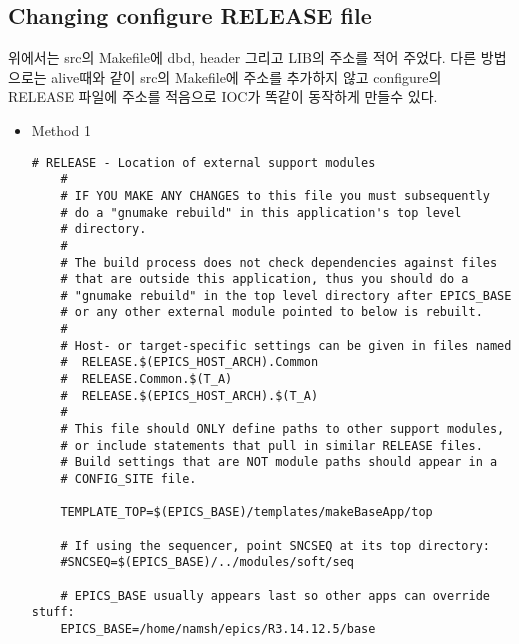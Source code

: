 \documentclass[11pt
  , a4paper
  , article
  , oneside
]{memoir}
\begin{document}
\subsection{Changing configure RELEASE file}
위에서는 src의 Makefile에 dbd, header 그리고 LIB의 주소를 적어 주었다. 다른 방법으로는 alive때와 같이
src의 Makefile에 주소를 추가하지 않고 configure의 RELEASE 파일에 주소를 적음으로 IOC가 똑같이
동작하게 만들수 있다.
\begin{itemize}
	\item Method 1
	
	\begin{lstlisting}[style=termstyle]
	# RELEASE - Location of external support modules
	#
	# IF YOU MAKE ANY CHANGES to this file you must subsequently
	# do a "gnumake rebuild" in this application's top level
	# directory.
	#
	# The build process does not check dependencies against files
	# that are outside this application, thus you should do a
	# "gnumake rebuild" in the top level directory after EPICS_BASE
	# or any other external module pointed to below is rebuilt.
	#
	# Host- or target-specific settings can be given in files named
	#  RELEASE.$(EPICS_HOST_ARCH).Common
	#  RELEASE.Common.$(T_A)
	#  RELEASE.$(EPICS_HOST_ARCH).$(T_A)
	#
	# This file should ONLY define paths to other support modules,
	# or include statements that pull in similar RELEASE files.
	# Build settings that are NOT module paths should appear in a
	# CONFIG_SITE file.
	
	TEMPLATE_TOP=$(EPICS_BASE)/templates/makeBaseApp/top
	
	# If using the sequencer, point SNCSEQ at its top directory:
	#SNCSEQ=$(EPICS_BASE)/../modules/soft/seq
	
	# EPICS_BASE usually appears last so other apps can override stuff:
	EPICS_BASE=/home/namsh/epics/R3.14.12.5/base
	

\end{lstlisting}
\end{itemize}
\end{document}
